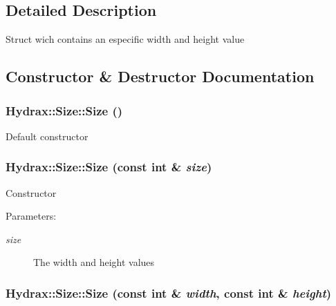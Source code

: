 \subsection{Detailed Description}
Struct wich contains an especific width and height value 

\subsection{Constructor \& Destructor Documentation}
\hypertarget{struct_hydrax_1_1_size_39cf079297d9a43d89c71e6fbd5ade83}{
\subsubsection[{Size}]{\setlength{\rightskip}{0pt plus 5cm}Hydrax::Size::Size ()}}
\label{struct_hydrax_1_1_size_39cf079297d9a43d89c71e6fbd5ade83}


Default constructor \hypertarget{struct_hydrax_1_1_size_551027687e3c4646e6887df821ff9e1b}{
\subsubsection[{Size}]{\setlength{\rightskip}{0pt plus 5cm}Hydrax::Size::Size (const int \& {\em size})}}
\label{struct_hydrax_1_1_size_551027687e3c4646e6887df821ff9e1b}


Constructor \begin{Desc}
\item[Parameters:]
\begin{description}
\item[{\em size}]The width and height values \end{description}
\end{Desc}
\hypertarget{struct_hydrax_1_1_size_a4a9f0e492ed8f602f6f5e5955042464}{
\subsubsection[{Size}]{\setlength{\rightskip}{0pt plus 5cm}Hydrax::Size::Size (const int \& {\em width}, \/  const int \& {\em height})}}
\label{struct_hydrax_1_1_size_a4a9f0e492ed8f602f6f5e5955042464}


